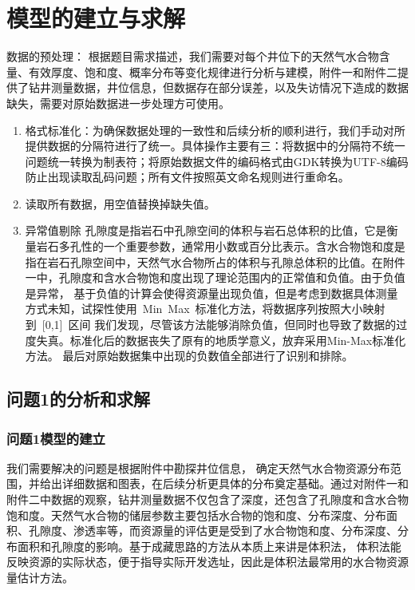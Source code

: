 \documentclass[12pt,a4paper]{nmmcm}
\begin{document}
\section{模型的建立与求解}

数据的预处理：
根据题目需求描述，我们需要对每个井位下的天然气水合物含量、有效厚度、饱和度、概率分布等变化规律进行分析与建模，附件一和附件二提供了钻井测量数据，井位信息，但数据存在部分误差，以及失访情况下造成的数据缺失，需要对原始数据进一步处理方可使用。
\begin{enumerate}
  \item 格式标准化：为确保数据处理的一致性和后续分析的顺利进行，我们手动对所提供数据的分隔符进行了统一。具体操作主要有三：将数据中的分隔符不统一问题统一转换为制表符；将原始数据文件的编码格式由GDK转换为UTF-8编码防止出现读取乱码问题；所有文件按照英文命名规则进行重命名。
  \item 读取所有数据，用空值替换掉缺失值。
  \item 异常值剔除
        孔隙度是指岩石中孔隙空间的体积与岩石总体积的比值，它是衡量岩石多孔性的一个重要参数，通常用小数或百分比表示。含水合物饱和度是指在岩石孔隙空间中，天然气水合物所占的体积与孔隙总体积的比值。在附件一中，孔隙度和含水合物饱和度出现了理论范围内的正常值和负值。由于负值是异常，
        基于负值的计算会使得资源量出现负值，但是考虑到数据具体测量方式未知，试探性使用 Min Max 标准化方法，将数据序列按照大小映射到 [0,1] 区间
        我们发现，尽管该方法能够消除负值，但同时也导致了数据的过度失真。标准化后的数据丧失了原有的地质学意义，放弃采用Min-Max标准化方法。
        最后对原始数据集中出现的负数值全部进行了识别和排除。
\end{enumerate}
\subsection{问题1的分析和求解}
\subsubsection{问题1模型的建立}
我们需要解决的问题是根据附件中勘探井位信息，
确定天然气水合物资源分布范围，并给出详细数据和图表，在后续分析更具体的分布奠定基础。通过对附件一和附件二中数据的观察，钻井测量数据不仅包含了深度，还包含了孔隙度和含水合物饱和度。天然气水合物的储层参数主要包括水合物的饱和度、分布深度、分布面积、孔隙度、渗透率等，而资源量的评估更是受到了水合物饱和度、分布深度、分布面积和孔隙度的影响。基于成藏思路的方法从本质上来讲是体积法，
体积法能反映资源的实际状态，便于指导实际开发选址，因此是体积法最常用的水合物资源量估计方法。
\end{document}
